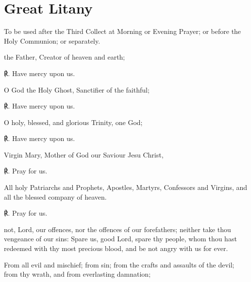 \label{litany}
\fancyhead[RE,LO]{}
\section{Great Litany}

\vspace{-1ex}

\begin{secrubric}
	{To be used after the Third Collect at Morning or Evening Prayer; or before the Holy Communion; or separately.}
\end{secrubric}
 the Father, Creator of heaven and earth;\par
   ℟. Have mercy upon us.
\par\noindent
   O God the Holy Ghost, Sanctifier of the faithful;

   ℟. Have mercy upon us.
   \par\noindent
   O holy, blessed, and glorious Trinity, one God;
   
   ℟. Have mercy upon us.
   \par\noindent
   Virgin Mary, Mother of God our Saviour Jesu Christ,\par
℟. Pray for us.\par\noindent
  All holy Patriarchs and Prophets, Apostles, Martyrs, Confessors and Virgins, and all the blessed company of heaven.\par
℟. Pray for us.
  \par\noindent
    not, Lord, our offences, nor the offences of our forefathers; neither take thou vengeance of our sins: Spare us, good Lord, spare thy people, whom thou hast redeemed with thy most precious blood, and be not angry with us for ever.\par  
   \par\noindent
    From all evil and mischief; from sin; from the crafts and assaults of the devil; from thy wrath, and from everlasting damnation;
    
